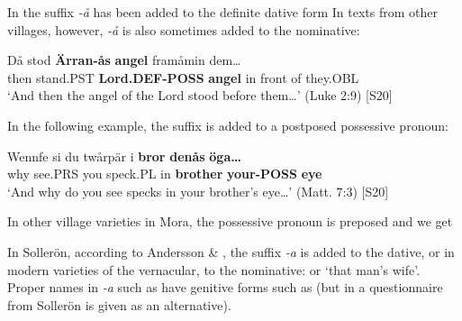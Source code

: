 In  the suffix\textit{ {}-å} has been added to the definite dative form In texts from other villages, however,\textit{ {}-å} is also sometimes added to the nominative:


\ea\label{}
\gll Då  stod  \textbf{Ärran-ås} \textbf{angel} framåmin  dem…\\
then  stand.PST  \textbf{Lord.DEF-POSS} \textbf{angel} in front of  they.OBL\\
\glt ‘And then the angel of the Lord stood before them…’ (Luke 2:9) [S20]
\z

In the following example, the suffix is added to a postposed possessive pronoun:


\ea\label{}
\gll Wennfe  si  du  twårpär  i  \textbf{bror} \textbf{denås} \textbf{öga…}\\
why  see.PRS  you  speck.PL  in  \textbf{brother} \textbf{your-POSS} \textbf{eye}\\
\glt ‘And why do you see specks in your brother’s eye…’ (Matt. 7:3) [S20]
\z

In other village varieties in Mora, the possessive pronoun is preposed and we get 


In Sollerön, according to Andersson \& \citet[357]{Danielsson1999}, the suffix\textit{ {}-a} is added to the dative, or in modern varieties of the vernacular, to the nominative:  or  ‘that man’s wife’. Proper names in\textit{ {}-a} such as  have genitive forms such as (but in a questionnaire from Sollerön  is given as an alternative).


